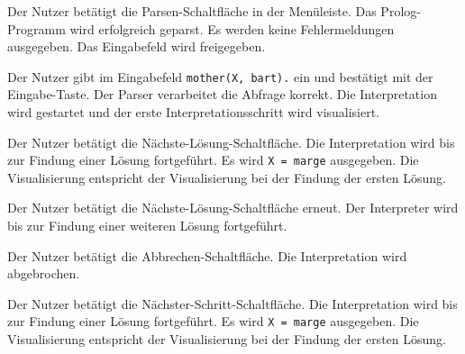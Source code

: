 \documentclass[parskip=full,11pt,twoside]{scrartcl}
\begin{document}
{Der Nutzer betätigt die Parsen-Schaltfläche in der Menüleiste.}
{Das Prolog-Programm wird erfolgreich geparst. Es werden keine Fehlermeldungen ausgegeben. Das Eingabefeld wird freigegeben.}

{Der Nutzer gibt im Eingabefeld \texttt{mother(X, bart).} ein und bestätigt mit der Eingabe-Taste.}
{Der Parser verarbeitet die Abfrage korrekt. Die Interpretation wird gestartet und der erste Interpretationsschritt wird visualisiert.}

{Der Nutzer betätigt die Nächste-Lösung-Schaltfläche.}
{Die Interpretation wird bis zur Findung einer Lösung fortgeführt. Es wird \texttt{X = marge} ausgegeben. Die Visualisierung entspricht der Visualisierung bei der Findung der ersten Lösung.}

{Der Nutzer betätigt die Nächste-Lösung-Schaltfläche erneut.}
{Der Interpreter wird bis zur Findung einer weiteren Lösung fortgeführt.}

{Der Nutzer betätigt die Abbrechen-Schaltfläche.}
{Die Interpretation wird abgebrochen.}


{Der Nutzer betätigt die Nächster-Schritt-Schaltfläche.}
{Die Interpretation wird bis zur Findung einer Lösung fortgeführt. Es wird \texttt{X = marge} ausgegeben. Die Visualisierung entspricht der Visualisierung bei der Findung der ersten Lösung.}
\end{document}

